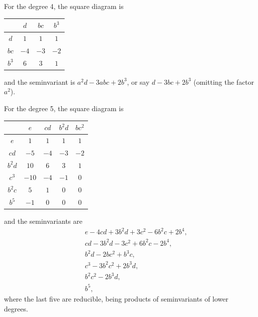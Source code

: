 \documentclass[11pt,a4paper]{book}
\begin{document}
\setcounter{art}{40}
\begin{art}
For the degree 4, the square diagram is
\begin{center}
\begin{tabular}{c|ccc}
 & $d$ & $bc$ & $b^{3}$ \\
\hline
$d$ & $1$ & $1$ & $1$ \\
$bc$ & $-4$ & $-3$ & $-2$ \\
$b^{3}$ & $6$ & $3$ & $1$ \\
\end{tabular}
\end{center}
and the seminvariant is $a^{2}d - 3abc + 2b^{3}$, or say $d - 3bc + 2b^{3}$ (omitting the factor $a^{2}$).
\end{art}

\setcounter{art}{41}
\begin{art}
For the degree 5, the square diagram is
\begin{center}
\begin{tabular}{c|cccc}
 & $e$ & $cd$ & $b^{2}d$ & $bc^{2}$ \\
\hline
$e$ & $1$ & $1$ & $1$ & $1$ \\
$cd$ & $-5$ & $-4$ & $-3$ & $-2$ \\
$b^{2}d$ & $10$ & $6$ & $3$ & $1$ \\
$c^{3}$ & $-10$ & $-4$ & $-1$ & $0$ \\
$b^{2}c$ & $5$ & $1$ & $0$ & $0$ \\
$b^{5}$ & $-1$ & $0$ & $0$ & $0$ \\
\end{tabular}
\end{center}
and the seminvariants are
\begin{align*}
&\phantom{+}e - 4cd + 3b^{2}d + 3c^{2} - 6b^{2}c + 2b^{4},\\
&\phantom{+}cd - 3b^{2}d - 3c^{2} + 6b^{2}c - 2b^{4},\\
&\phantom{+}b^{2}d - 2bc^{2} + b^{3}c,\\
&\phantom{+}c^{3} - 3b^{2}c^{2} + 2b^{3}d,\\
&\phantom{+}b^{2}c^{2} - 2b^{3}d,\\
&\phantom{+}b^{5},
\end{align*}
where the last five are reducible, being products of seminvariants of lower degrees.
\end{art}
\end{document}
